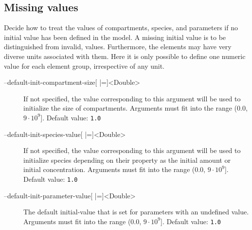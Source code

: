 \subsection{Missing values}
Decide how to treat the values of compartments, species, and parameters if no initial value has been defined in the model. A missing initial value is to be distinguished from invalid, \ie \NaN values. Furthermore, the elements may have very diverse units associated with them. Here it is only possible to define one numeric value for each element group, irrespective of any unit.
\begin{description}
\item[--default-init-compartment-size{[} |={]}<Double>]
          If not specified, the value corresponding to this argument will
          be used to initialize the size of compartments.
          Arguments must fit into the range (0.0, $9\cdot 10^9${]}.
          Default value: \texttt{1.0}
\item[--default-init-species-value{[} |={]}<Double>]
          If not specified, the value corresponding to this argument will
          be used to initialize species depending on their \hasOnlySubstanceUnits
          property as the initial amount or initial concentration.
          Arguments must fit into the range (0.0, $9\cdot 10^9${]}.
          Default value: \texttt{1.0}
\item[--default-init-parameter-value{[} |={]}<Double>]
          The default initial-value that is set for parameters with an undefined value.
          Arguments must fit into the range (0.0, $9\cdot 10^9${]}.
          Default value: \texttt{1.0}
\end{description}

